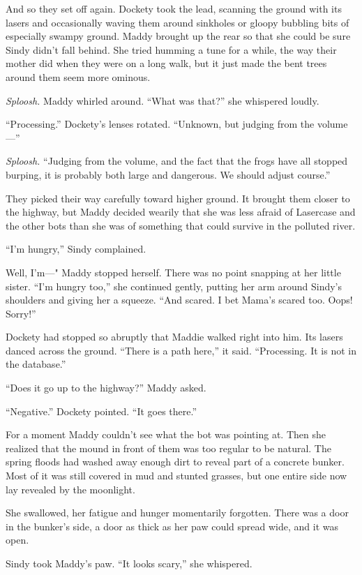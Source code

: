 \documentclass[10pt]{article}
\begin{document}
And so they set off again. Dockety took the lead, scanning the ground
with its lasers and occasionally waving them around sinkholes or gloopy
bubbling bits of especially swampy ground. Maddy brought up the rear so
that she could be sure Sindy didn't fall behind. She tried humming a
tune for a while, the way their mother did when they were on a long
walk, but it just made the bent trees around them seem more ominous.

\emph{Sploosh.} Maddy whirled around. ``What was that?'' she whispered
loudly.

``Processing.'' Dockety's lenses rotated. ``Unknown, but judging from
the volume---''

\emph{Sploosh.} ``Judging from the volume, and the fact that the frogs
have all stopped burping, it is probably both large and dangerous. We
should adjust course.''

They picked their way carefully toward higher ground. It brought them
closer to the highway, but Maddy decided wearily that she was less
afraid of Lasercase and the other bots than she was of something that
could survive in the polluted river.

``I'm hungry,'' Sindy complained.

Well, I'm---" Maddy stopped herself. There was no point snapping at her
little sister. ``I'm hungry too,'' she continued gently, putting her arm
around Sindy's shoulders and giving her a squeeze. ``And scared. I bet
Mama's scared too. Oops! Sorry!''

Dockety had stopped so abruptly that Maddie walked right into him. Its
lasers danced across the ground. ``There is a path here,'' it said.
``Processing. It is not in the database.''

``Does it go up to the highway?'' Maddy asked.

``Negative.'' Dockety pointed. ``It goes there.''

For a moment Maddy couldn't see what the bot was pointing at. Then she
realized that the mound in front of them was too regular to be natural.
The spring floods had washed away enough dirt to reveal part of a
concrete bunker. Most of it was still covered in mud and stunted
grasses, but one entire side now lay revealed by the moonlight.

She swallowed, her fatigue and hunger momentarily forgotten. There was a
door in the bunker's side, a door as thick as her paw could spread wide,
and it was open.

Sindy took Maddy's paw. ``It looks scary,'' she whispered.
\end{document}
